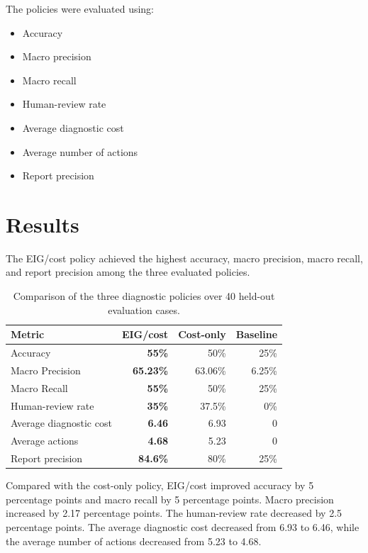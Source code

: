 \documentclass{article}
\begin{document}
The policies were evaluated using:
\begin{itemize}
    \item Accuracy
    \item Macro precision
    \item Macro recall
    \item Human-review rate
    \item Average diagnostic cost
    \item Average number of actions
    \item Report precision
\end{itemize}

\section{Results}

The EIG/cost policy achieved the highest accuracy, macro precision, macro recall, and report precision among the three evaluated policies.

\begin{table}[t]
\centering
\caption{Comparison of the three diagnostic policies over 40 held-out evaluation cases.}
\label{tab:results}
\begin{tabular}{lrrr}
\toprule
Metric & EIG/cost & Cost-only & Baseline \\
\midrule
Accuracy & \textbf{55\%} & 50\% & 25\% \\
Macro Precision & \textbf{65.23\%} & 63.06\% & 6.25\% \\
Macro Recall & \textbf{55\%} & 50\% & 25\% \\
Human-review rate & \textbf{35\%} & 37.5\% & 0\% \\
Average diagnostic cost & \textbf{6.46} & 6.93 & 0 \\
Average actions & \textbf{4.68} & 5.23 & 0 \\
Report precision & \textbf{84.6\%} & 80\% & 25\% \\
\bottomrule
\end{tabular}
\end{table}

Compared with the cost-only policy, EIG/cost improved accuracy by 5 percentage points and macro recall by 5 percentage points. Macro precision increased by 2.17 percentage points. The human-review rate decreased by 2.5 percentage points. The average diagnostic cost decreased from 6.93 to 6.46, while the average number of actions decreased from 5.23 to 4.68.
\end{document}

